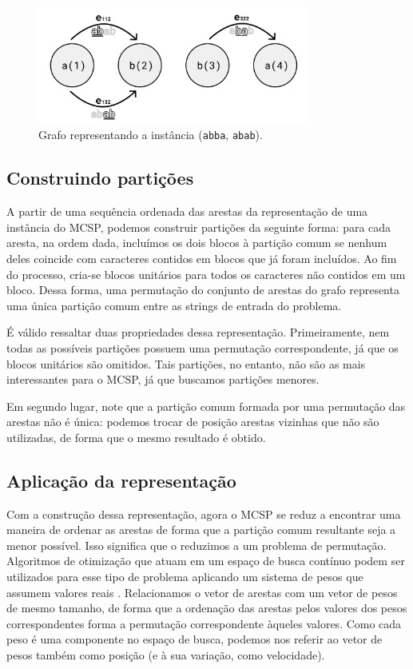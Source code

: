\begin{figure}
    \centering
    \includegraphics[width=0.8\textwidth]{images/grafo.pdf}

    \caption{Grafo representando a instância (\texttt{abba}, \texttt{abab}).}
    \label{fig:grafo}
\end{figure}

\subsection{Construindo partições} \label{sec:construindo-particoes}

    A partir de uma sequência ordenada das arestas da representação de uma instância do MCSP, podemos construir partições da seguinte forma: para cada aresta, na ordem dada, incluímos os dois blocos à partição comum se nenhum deles coincide com caracteres contidos em blocos que já foram incluídos. Ao fim do processo, cria-se blocos unitários para todos os caracteres não contidos em um bloco. Dessa forma, uma permutação do conjunto de arestas do grafo representa uma única partição comum entre as strings de entrada do problema.

    É válido ressaltar duas propriedades dessa representação. Primeiramente, nem todas as possíveis partições possuem uma permutação correspondente, já que os blocos unitários são omitidos. Tais partições, no entanto, não são as mais interessantes para o MCSP, já que buscamos partições menores.

    Em segundo lugar, note que a partição comum formada por uma permutação das arestas não é única: podemos trocar de posição arestas vizinhas que não são utilizadas, de forma que o mesmo resultado é obtido.

\subsection{Aplicação da representação}

    Com a construção dessa representação, agora o MCSP se reduz a encontrar uma maneira de ordenar as arestas de forma que a partição comum resultante seja a menor possível. Isso significa que o reduzimos a um problema de permutação. Algoritmos de otimização que atuam em um espaço de busca contínuo podem ser utilizados para esse tipo de problema aplicando um sistema de pesos que assumem valores reais \cite[p.~661]{marti_handbook_2018}. Relacionamos o vetor de arestas com um vetor de pesos de mesmo tamanho, de forma que a ordenação das arestas pelos valores dos pesos correspondentes forma a permutação correspondente àqueles valores. Como cada peso é uma componente no espaço de busca, podemos nos referir ao vetor de pesos também como posição (e à sua variação, como velocidade).
